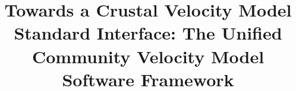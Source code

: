 
\title{Towards a Crustal Velocity Model Standard Interface: The Unified Community Velocity Model Software Framework}
